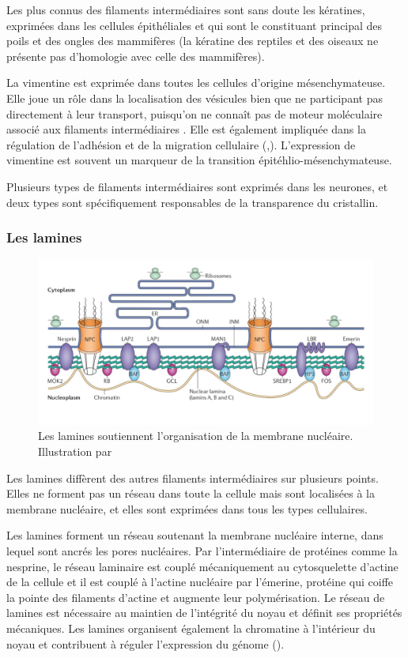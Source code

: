 Les plus connus des filaments intermédiaires sont sans doute les kératines, exprimées dans les cellules épithéliales et qui sont le constituant principal des poils et des ongles des mammifères (la kératine des reptiles et des oiseaux ne présente pas d'homologie avec celle des mammifères). 

La vimentine est exprimée dans toutes les cellules d'origine mésenchymateuse. Elle joue un rôle dans la localisation des vésicules bien que ne participant pas directement à leur transport, puisqu'on ne connaît pas de moteur moléculaire associé aux filaments intermédiaires  \parencite{styers_intermediate_2005}. Elle est également impliquée dans la régulation de l'adhésion et de la migration cellulaire  (\cite{lynch_endoplasmic_2013},\cite{helfand_vimentin_2011}). 
L'expression de vimentine est souvent un marqueur de la transition épitéhlio-mésenchymateuse. 

Plusieurs types de filaments intermédiaires sont exprimés dans les neurones, et deux types sont spécifiquement responsables de la transparence du cristallin. 

\subsubsection{Les lamines}
\begin{figure}
\includegraphics[scale=1.5]{Structure_and_function_of_the_nuclear_lamina.jpg}
\caption{Les lamines soutiennent l'organisation de la membrane nucléaire. Illustration par  \cite{coutinho_molecular_2009}}
\end{figure}
Les lamines diffèrent des autres filaments intermédiaires sur plusieurs points. Elles ne forment pas un réseau dans toute la cellule mais sont localisées à la membrane nucléaire, et elles sont exprimées dans tous les types cellulaires. 

Les lamines forment un réseau soutenant la membrane nucléaire interne, dans lequel sont ancrés les pores nucléaires. Par l'intermédiaire de protéines comme la nesprine, le réseau laminaire est couplé mécaniquement au cytosquelette d'actine de la cellule et il est couplé à l'actine nucléaire par l'émerine, protéine qui coiffe la pointe des filaments d'actine et augmente leur polymérisation. 
Le réseau de lamines est nécessaire au maintien de l'intégrité du noyau et définit ses propriétés mécaniques. 
Les lamines organisent également la chromatine à l'intérieur du noyau et contribuent à réguler l'expression du génome (\cite{dechat_nuclear_2008}).

